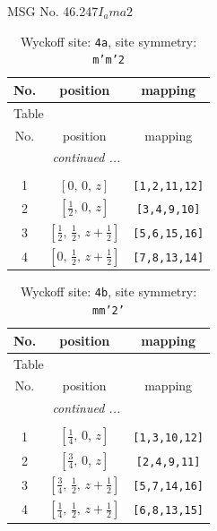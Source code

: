 \documentclass[fleqn,8pt]{jsarticle}
\begin{document}
\setcounter{MaxMatrixCols}{32}

\renewcommand{\tablename}{Table~}
\renewcommand{\figurename}{Figure~}
\begin{center}
\LARGE
MSG No. 46.247\quad$I_{a}ma2$
\end{center}
\renewcommand{\arraystretch}{1.2}
\begin{longtable}{ccc}
\caption{Wyckoff site: {\tt 4a}, site symmetry: {\tt m'm'2}}
 \\
 \hline \hline
No. & position & mapping \\ \hline \endfirsthead

\multicolumn{2}{l}{\tablename\ \thetable{}} \\
 \hline \hline
No. & position & mapping \\ \hline \endhead

 \hline \hline
\multicolumn{2}{r}{\footnotesize\it continued ...} \\ \endfoot

 \hline \hline
\multicolumn{2}{r}{} \\ \endlastfoot

1 & $\left[ 0,\, 0,\, z \right]$ & {\tt [1,2,11,12]} \\ \hline
2 & $\left[ \frac{1}{2},\, 0,\, z \right]$ & {\tt [3,4,9,10]} \\ \hline
3 & $\left[ \frac{1}{2},\, \frac{1}{2},\, z + \frac{1}{2} \right]$ & {\tt [5,6,15,16]} \\ \hline
4 & $\left[ 0,\, \frac{1}{2},\, z + \frac{1}{2} \right]$ & {\tt [7,8,13,14]} \\
\end{longtable}
\renewcommand{\arraystretch}{1.2}
\begin{longtable}{ccc}
\caption{Wyckoff site: {\tt 4b}, site symmetry: {\tt mm'2'}}
 \\
 \hline \hline
No. & position & mapping \\ \hline \endfirsthead

\multicolumn{2}{l}{\tablename\ \thetable{}} \\
 \hline \hline
No. & position & mapping \\ \hline \endhead

 \hline \hline
\multicolumn{2}{r}{\footnotesize\it continued ...} \\ \endfoot

 \hline \hline
\multicolumn{2}{r}{} \\ \endlastfoot

1 & $\left[ \frac{1}{4},\, 0,\, z \right]$ & {\tt [1,3,10,12]} \\ \hline
2 & $\left[ \frac{3}{4},\, 0,\, z \right]$ & {\tt [2,4,9,11]} \\ \hline
3 & $\left[ \frac{3}{4},\, \frac{1}{2},\, z + \frac{1}{2} \right]$ & {\tt [5,7,14,16]} \\ \hline
4 & $\left[ \frac{1}{4},\, \frac{1}{2},\, z + \frac{1}{2} \right]$ & {\tt [6,8,13,15]} \\
\end{longtable}
\end{document}
